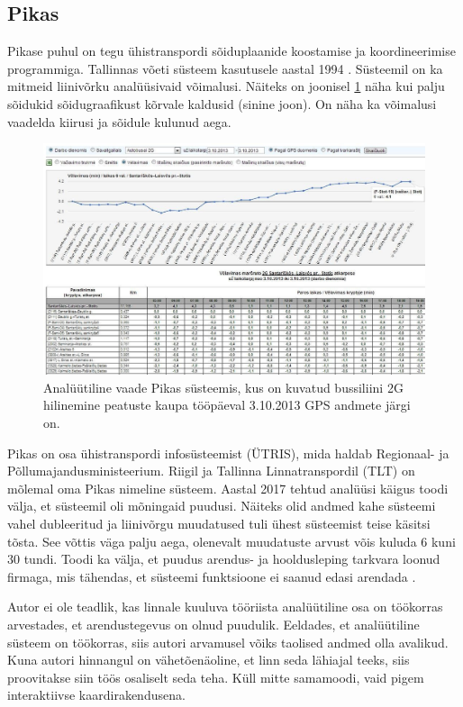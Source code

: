 \subsection{Pikas}

Pikase puhul on tegu ühistranspordi sõiduplaanide koostamise ja koordineerimise programmiga. Tallinnas võeti süsteem kasutusele aastal 1994 \cite{merakas_projects}. Süsteemil on ka mitmeid liinivõrku analüüsivaid võimalusi. Näiteks on joonisel \ref{fig:pikasLeedu} näha kui palju sõidukid sõidugraafikust kõrvale kaldusid (sinine joon). On näha ka võimalusi vaadelda kiirusi ja sõidule kulunud aega. 

\begin{figure}[h!]
    \centering
    \includegraphics[width=1\textwidth]{figures/pikasLeedu.jpg}
    \caption{Analüütiline vaade Pikas süsteemis, kus on kuvatud bussiliini 2G hilinemine peatuste kaupa tööpäeval 3.10.2013 GPS andmete järgi on\cite{merakas_pikas}.}
    \label{fig:pikasLeedu}
\end{figure}


Pikas on osa ühistranspordi infosüsteemist (ÜTRIS), mida haldab Regionaal- ja Põllumajandusministeerium. Riigil ja Tallinna Linnatranspordil (TLT) on mõlemal oma Pikas nimeline süsteem. Aastal 2017 tehtud analüüsi käigus toodi välja, et süsteemil oli mõningaid puudusi. Näiteks olid andmed kahe süsteemi vahel dubleeritud ja liinivõrgu muudatused tuli ühest süsteemist teise käsitsi tõsta. See võttis väga palju aega, olenevalt muudatuste arvust võis kuluda 6 kuni 30 tundi. Toodi ka välja, et puudus arendus- ja hooldusleping tarkvara loonud firmaga, mis tähendas, et süsteemi funktsioone ei saanud edasi arendada \cite{tallinn_infosusteem_2017}. 

Autor ei ole teadlik, kas linnale kuuluva tööriista analüütiline osa on töökorras arvestades, et arendustegevus on olnud puudulik. Eeldades, et analüütiline süsteem on töökorras, siis autori arvamusel võiks taolised andmed olla avalikud. Kuna autori hinnangul on vähetõenäoline, et linn seda lähiajal teeks, siis proovitakse siin töös osaliselt seda teha. Küll mitte samamoodi, vaid pigem interaktiivse kaardirakendusena.

